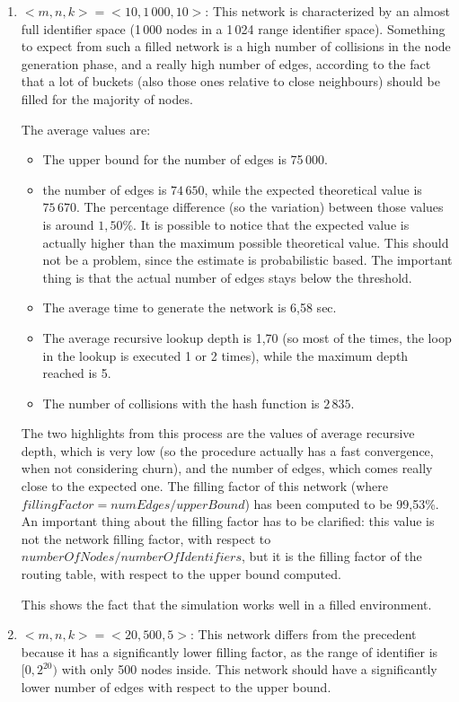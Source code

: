 \documentclass[11pt, a4paper]{report}
\begin{document}
	\begin{enumerate}
		\item $<\!m, n, k\!> = <\!10, 1\,000, 10\!>$: This network is characterized by an almost full identifier space (1\,000 nodes in a 1\,024 range identifier space). Something to expect from such a filled network is a high number of collisions in the node generation phase, and a really high number of edges, according to the fact that a lot of buckets (also those ones relative to close neighbours) should be filled for the majority of nodes.
		\par
		The average values are:
		\begin{itemize}
			\item The upper bound for the number of edges is 75\,000.
			\item the number of edges is $74\,650$, while the expected theoretical value is $75\,670$. The percentage difference (so the variation) between those values is around $1,50\%$. It is possible to notice that the expected value is actually higher than the maximum possible theoretical value. This should not be a problem, since the estimate is probabilistic based. The important thing is that the actual number of edges stays below the threshold.
			\item The average time to generate the network is 6,58 sec.
			\item The average recursive lookup depth is 1,70 (so most of the times, the loop in the lookup is executed 1 or 2 times), while the maximum depth reached is 5.
			\item The number of collisions with the hash function is $2\,835$.
		\end{itemize}
		The two highlights from this process are the values of average recursive depth, which is very low (so the procedure actually has a fast convergence, when not considering churn), and the number of edges, which comes really close to the expected one. The filling factor of this network (where $fillingFactor = numEdges/upperBound$) has been computed to be 99,53\%. An important thing about the filling factor has to be clarified: this value is not the network filling factor, with respect to $numberOfNodes / numberOfIdentifiers$, but it is the filling factor of the routing table, with respect to the upper bound computed.
		\par 
		This shows the fact that the simulation works well in a filled environment.
		\item $<\!m, n, k\!> = <\!20, 500, 5\!>$: This network differs from the precedent because it has a significantly lower filling factor, as the range of identifier is $[0, 2^{20})$ with only 500 nodes inside. This network should have a significantly lower number of edges with respect to the upper bound.

\end{enumerate}
\end{document}
